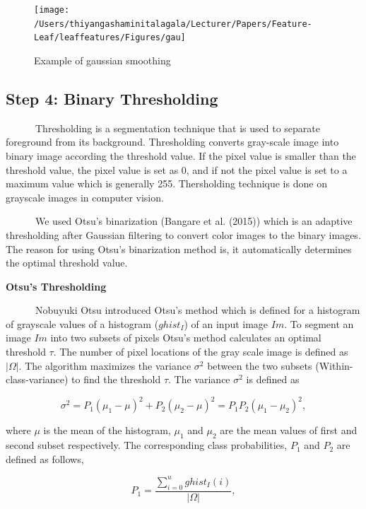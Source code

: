 \documentclass{article}
\begin{document}
\begin{figure}[!ht]

{\centering \texttt{[image: /Users/thiyangashaminitalagala/Lecturer/Papers/Feature-Leaf/leaffeatures/Figures/gau]} 

}

\caption{\label{figgau}Example of gaussian smoothing}\label{fig:unnamed-chunk-5}
\end{figure}

\hypertarget{step-4-binary-thresholding}{%
\subsection{Step 4: Binary
Thresholding}\label{step-4-binary-thresholding}}

~~~~~~Thresholding is a segmentation technique that is used to separate
foreground from its background. Thresholding converts gray-scale image
into binary image according the threshold value. If the pixel value is
smaller than the threshold value, the pixel value is set as 0, and if
not the pixel value is set to a maximum value which is generally 255.
Thersholding technique is done on grayscale images in computer vision.

~~~~~~We used Otsu's binarization (Bangare et al. (2015)) which is an
adaptive thresholding after Gaussian filtering to convert color images
to the binary images. The reason for using Otsu's binarization method
is, it automatically determines the optimal threshold value.

\textbf{Otsu's Thresholding}

~~~~~~Nobuyuki Otsu introduced Otsu's method which is defined for a
histogram of grayscale values of a histogram (\(ghist_I\)) of an input
image \(Im\). To segment an image \(Im\) into two subsets of pixels
Otsu's method calculates an optimal threshold \(\tau\). The number of
pixel locations of the gray scale image is defined as \(|\Omega|\). The
algorithm maximizes the variance \(\sigma^2\) between the two subsets
(Within-class-variance) to find the threshold \(\tau\). The variance
\(\sigma^2\) is defined as

\[\sigma^2 = P_1(\mu_1-\mu)^2 + P_2(\mu_2-\mu)^2 = P_1P_2(\mu_1-\mu_2)^2, \]

where \(\mu\) is the mean of the histogram, \(\mu_1\) and \(\mu_2\) are
the mean values of first and second subset respectively. The
corresponding class probabilities, \(P_1\) and \(P_2\) are defined as
follows,

\[P_1 = \frac{\sum_{i=0}^{u}ghist_I(i)}{|\Omega|},\]
\end{document}
